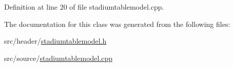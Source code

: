 Definition at line 20 of file stadiumtablemodel.\+cpp.



The documentation for this class was generated from the following files\+:\begin{DoxyCompactItemize}
\item 
src/header/\hyperlink{stadiumtablemodel_8h}{stadiumtablemodel.\+h}\item 
src/source/\hyperlink{stadiumtablemodel_8cpp}{stadiumtablemodel.\+cpp}\end{DoxyCompactItemize}
